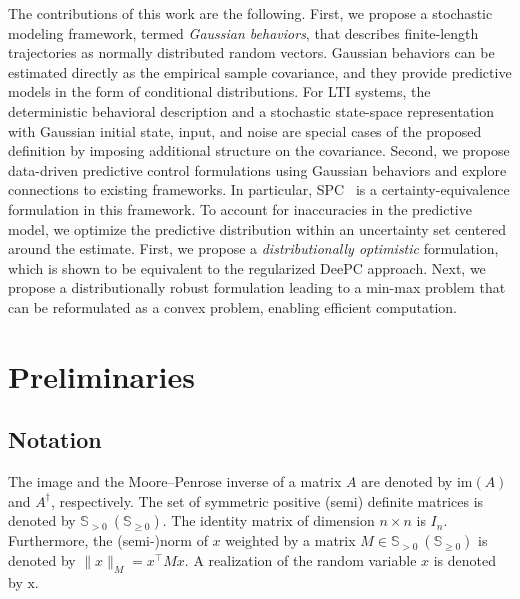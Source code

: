 \documentclass[letterpaper, 10 pt, conference]{ieeeconf}
\begin{document}
The contributions of this work are the following.
First, we propose a stochastic modeling framework, termed \textit{Gaussian behaviors}, that describes finite-length trajectories as normally distributed random vectors.
Gaussian behaviors can be estimated directly as the empirical sample covariance, and they provide predictive models in the form of conditional distributions.
For \gls{LTI} systems, the deterministic behavioral description and a stochastic state-space representation with Gaussian initial state, input, and noise are special cases of the proposed definition by imposing additional structure on the covariance.
Second, we propose data-driven predictive control formulations using Gaussian behaviors and explore connections to existing frameworks.
In particular, \acrfull{SPC}~\cite{favoreel1999spc} is a certainty-equivalence formulation in this framework.
To account for inaccuracies in the predictive model, we optimize the predictive distribution within an uncertainty set centered around the estimate.
First, we propose a \textit{distributionally optimistic} formulation, which is shown to be equivalent to the regularized \acrfull{DeePC} approach.
Next, we propose a distributionally robust formulation leading to a min-max problem that can be reformulated as a convex problem, enabling efficient computation.


\section{Preliminaries}
\subsection{Notation}
The image and the Moore–Penrose inverse of a matrix $A$ are denoted by $\mathrm{im}(A)$ and $A^\dagger$, respectively.
The set of symmetric positive (semi) definite matrices is denoted by $\mathbb{S}_{>0}~(\mathbb{S}_{\geq0})$.
The identity matrix of dimension $n \times n$ is $I_{n}$.
Furthermore, the (semi-)norm of $x$ weighted by a matrix $M\in\mathbb{S}_{>0}~(\mathbb{S}_{\geq0})$ is denoted by $\|x\|_{M}= x^\top M x$. A realization of the random variable $x$ is denoted by $\mathrm{x}$.
\end{document}
